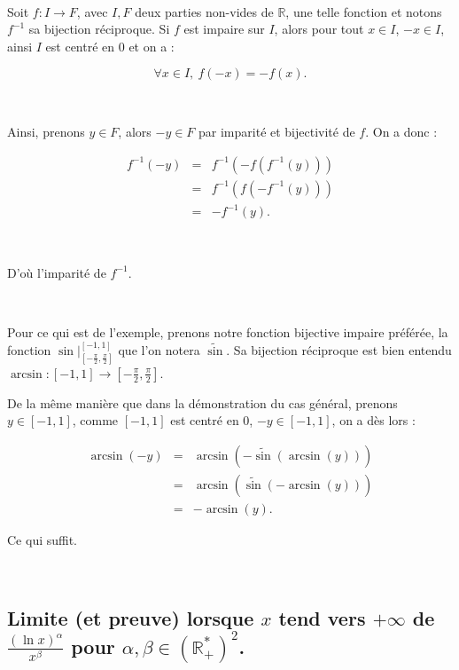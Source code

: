 \documentclass{article}
\begin{document}
\

Soit $f: I \to F$, avec $I,F$ deux parties non-vides de $\mathbb{R}$, une telle fonction et notons $f^{-1}$ sa bijection réciproque. Si $f$ est impaire sur $I$, alors pour tout $x\in I$, $-x\in I$, ainsi $I$ est centré en $0$ et on a : 

\begin{equation*}
    \forall x \in I, \ f(-x) = -f(x).
\end{equation*}

\

Ainsi, prenons $y\in F$, alors $-y \in F$ par imparité et bijectivité de $f$. On a donc : 

\begin{eqnarray*}
f^{-1}(-y) & = & f^{-1}(-f(f^{-1}(y))) \\
           & = & f^{-1}(f(-f^{-1}(y))) \\
           & = & -f^{-1}(y).
\end{eqnarray*}

\

D'où l'imparité de $f^{-1}$.

\

Pour ce qui est de l'exemple, prenons notre fonction bijective impaire préférée, la fonction $\textstyle \sin |_{\left[ -\frac{\pi}{2}, \frac{\pi}{2}\right] }^{[-1,1]}$ que l'on notera $\widetilde{\sin}$. Sa bijection réciproque est bien entendu $\textstyle \arcsin : [-1,1] \to \left[ -\frac{\pi}{2}, \frac{\pi}{2}\right]$.

De la même manière que dans la démonstration du cas général, prenons $y\in [-1, 1]$, comme $[-1,1]$ est centré en $0$, $-y\in [-1,1]$, on a dès lors : 

\begin{eqnarray*}
\arcsin(-y) & = & \arcsin(-\widetilde{\sin}(\arcsin(y))) \\
           & = & \arcsin(\widetilde{\sin}(-\arcsin(y))) \\
           & = & -\arcsin(y).
\end{eqnarray*}

Ce qui suffit.

\


\subsection{Limite (et preuve) lorsque $x$ tend vers $+\infty$ de $\frac{(\ln x)^{\alpha}}{x^{\beta}}$ pour $\alpha ,\beta \in \left( \mathbb{R}_+^*\right) ^2$.} 
\end{document}
